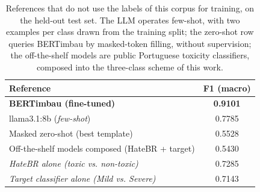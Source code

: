 \begin{table}[!t]
\centering
\caption{References that do not use the labels of this corpus for training, on the held-out test set. The LLM operates few-shot, with two examples per class drawn from the training split; the zero-shot row queries BERTimbau by masked-token filling, without supervision; the off-the-shelf models are public Portuguese toxicity classifiers, composed into the three-class scheme of this work.}
\label{tab:sem-finetuning}
\begin{tabular}{lc}
\toprule
Reference & F1 (macro) \\
\midrule
\textbf{BERTimbau (fine-tuned)} & \textbf{0.9101} \\
llama3.1:8b (\emph{few-shot}) & 0.7785 \\
Masked zero-shot (best template) & 0.5528 \\
Off-the-shelf models composed (HateBR + target) & 0.5430 \\
\midrule
\emph{HateBR alone (toxic vs. non-toxic)} & 0.7285 \\
\emph{Target classifier alone (Mild vs. Severe)} & 0.7143 \\
\bottomrule
\end{tabular}
\end{table}
